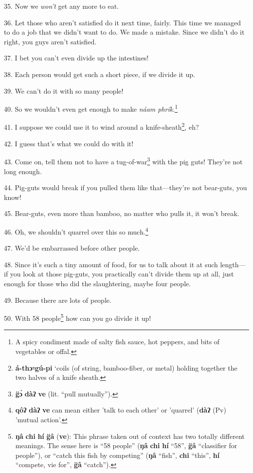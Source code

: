 35. Now we \textit{won't} get any more to eat.

36. Let those who aren't satisfied do it next time, fairly. This time we managed
to do a job that we didn't want to do. We made a mistake. Since we didn't do it
right, you guys aren't satisfied.


37. I bet you can't even divide up the intestines!

38. Each person would get such a short piece, if we divide it up.

39. We can't do it with so many people!

40. So we wouldn't even get enough to make \textit{náam phrík}.\footnote{A spicy condiment made of salty fish sauce, hot peppers, and bits of vegetables or offal.}

41. I suppose we could use it to wind around a knife-sheath\footnote{\textbf{á-thɔ꞊gú-pi} `coils (of string, bamboo-fiber, or metal) holding together the two halves of a knife sheath.}, eh?

42. I guess that's what we could do with it!

43. Come on, tell them not to have a tug-of-war\footnote{\textbf{g̈ɔ̀} \textbf{dàʔ} \textbf{ve} (lit. ``pull mutually'').} with the pig guts! They're
not long enough.

44. Pig-guts would break if you pulled them like that---they're not bear-guts,
you know!

45. Bear-guts, even more than bamboo, no matter who pulls it, it won't break.

46. Oh, we shouldn't quarrel over this so much.\footnote{\textbf{qôʔ} \textbf{dàʔ} \textbf{ve} can mean either 'talk to each other' or 'quarrel' (\textbf{dàʔ} (Pv) 'mutual action'.}

47. We'd be embarrassed before other people.

48. Since it's such a tiny amount of food, for us to talk about it at such length---if
you look at those pig-guts, you practically can't divide them up at all, just enough
for those who did the slaughtering, maybe four people.

49. Because there are lots of people.

50. With 58 people\footnote{\textbf{ŋâ} \textbf{chi} \textbf{hí} \textbf{g̈â} (\textbf{ve}): This phrase taken out of context has two totally different meanings. The sense here is ``58 people'' (\textbf{ŋâ} \textbf{chi} \textbf{hí} ``58'', \textbf{g̈â} ``classifier for people''), or ``catch this fish by competing'' (\textbf{ŋâ} ``fish'', \textbf{chi} ``this'', \textbf{hí} ``compete, vie for'', \textbf{g̈â} ``catch'').} how can you go divide it up!

